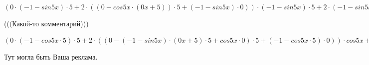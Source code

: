 \documentclass[12pt,a4paper,fleqn]{article}
\theoremstyle{definition}
\begin{document}
$( 0  \cdot ( -1  - sin 5  x ) \cdot  5  +  2  \cdot (( 0  - cos 5  x  \cdot ( 0  x  +  5 )) \cdot  5  + ( -1  - sin 5  x ) \cdot  0 )) \cdot ( -1  - sin 5  x ) \cdot  5  +  2  \cdot ( -1  - sin 5  x ) \cdot  5  \cdot (( 0  - cos 5  x  \cdot ( 0  x  +  5 )) \cdot  5  + ( -1  - sin 5  x ) \cdot  0 ) = ( 0  \cdot ( -1  - sin 5  x ) \cdot  5  +  2  \cdot (( 0  - cos 5  x  \cdot ( 0  x  +  5 )) \cdot  5  + ( -1  - sin 5  x ) \cdot  0 )) \cdot ( -1  - sin 5  x ) \cdot  5  +  2  \cdot ( -1  - sin 5  x ) \cdot  5  \cdot (( 0  - cos 5  x  \cdot ( 0  x  +  5 )) \cdot  5  + ( -1  - sin 5  x ) \cdot  0 )$

(((Какой-то комментарий))) 

$( 0  \cdot ( -1  - cos 5  x  \cdot  5 ) \cdot  5  +  2  \cdot (( 0  - ( -1  - sin 5  x ) \cdot ( 0  x  +  5 ) \cdot  5  + cos 5  x  \cdot  0 ) \cdot  5  + ( -1  - cos 5  x  \cdot  5 ) \cdot  0 )) \cdot cos 5  x  +  2  \cdot ( -1  - cos 5  x  \cdot  5 ) \cdot  5  \cdot ( -1  - sin 5  x ) \cdot ( 0  x  +  5 ) + ( 0  \cdot ( -1  - sin 5  x ) \cdot  5  +  2  \cdot (( 0  - cos 5  x  \cdot ( 0  x  +  5 )) \cdot  5  + ( -1  - sin 5  x ) \cdot  0 )) \cdot ( -1  - sin 5  x ) \cdot  5  +  2  \cdot ( -1  - sin 5  x ) \cdot  5  \cdot (( 0  - cos 5  x  \cdot ( 0  x  +  5 )) \cdot  5  + ( -1  - sin 5  x ) \cdot  0 ) = ( 0  \cdot ( -1  - cos 5  x  \cdot  5 ) \cdot  5  +  2  \cdot (( 0  - ( -1  - sin 5  x ) \cdot ( 0  x  +  5 ) \cdot  5  + cos 5  x  \cdot  0 ) \cdot  5  + ( -1  - cos 5  x  \cdot  5 ) \cdot  0 )) \cdot cos 5  x  +  2  \cdot ( -1  - cos 5  x  \cdot  5 ) \cdot  5  \cdot ( -1  - sin 5  x ) \cdot ( 0  x  +  5 ) + ( 0  \cdot ( -1  - sin 5  x ) \cdot  5  +  2  \cdot (( 0  - cos 5  x  \cdot ( 0  x  +  5 )) \cdot  5  + ( -1  - sin 5  x ) \cdot  0 )) \cdot ( -1  - sin 5  x ) \cdot  5  +  2  \cdot ( -1  - sin 5  x ) \cdot  5  \cdot (( 0  - cos 5  x  \cdot ( 0  x  +  5 )) \cdot  5  + ( -1  - sin 5  x ) \cdot  0 )$

Тут могла быть Ваша реклама. 
\end{document}
